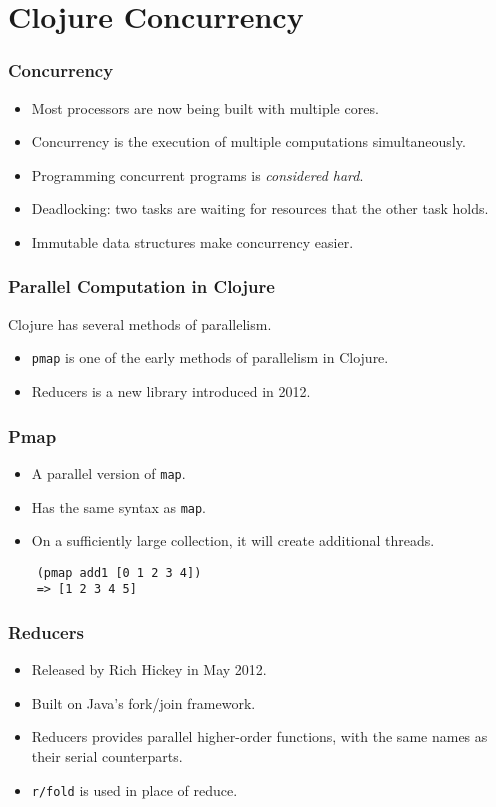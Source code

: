 \documentclass{beamer}
\newcommand{\clocode}[1]{{\texttt {#1}}}
\begin{document}
\section{Clojure Concurrency}

\begin{frame}
\frametitle{Concurrency}
	\begin{itemize}
	 \item Most processors are now being built with multiple cores.
	 \item Concurrency is the execution of multiple computations simultaneously.
	 \item Programming concurrent programs is \textit{considered hard}.
	 \item Deadlocking: two tasks are waiting for resources that the other task holds.
	 \item Immutable data structures make concurrency easier.
	\end{itemize}	
\end{frame}
\begin{frame}
\frametitle{Parallel Computation in Clojure}
	Clojure has several methods of parallelism.
	\begin{itemize}
	\item \clocode{pmap} is one of the early methods of parallelism in Clojure.
	\item Reducers is a new library introduced in 2012.
	\end{itemize}
\end{frame}
\begin{frame}[fragile]
\frametitle{Pmap}
	\begin{itemize}
	 \item A parallel version of \clocode{map}.
	 \item Has the same syntax as \clocode{map}.
	 \item On a sufficiently large collection, it will create additional threads.
	\end{itemize}	
	\begin{verbatim} 
	(pmap add1 [0 1 2 3 4])
	=> [1 2 3 4 5]
	\end{verbatim}
\end{frame}
\begin{frame}[fragile]
\frametitle{Reducers}
	\begin{itemize}
	 \item Released by Rich Hickey in May 2012.
	 \item Built on Java's fork/join framework.
	 \item Reducers provides parallel higher-order functions, with the same names as their serial counterparts.
	 \item \clocode{r/fold} is used in place of reduce.
	\end{itemize}
\end{frame}
\end{document}
